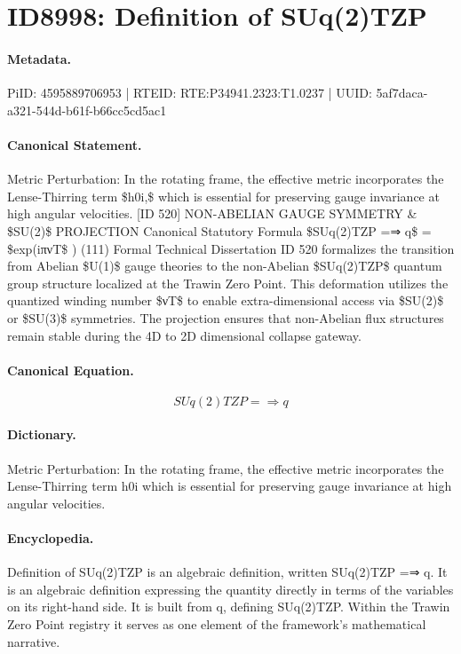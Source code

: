 \section*{ID8998: Definition of SUq(2)TZP}
\paragraph{Metadata.}
PiID: 4595889706953 | RTEID: RTE:P34941.2323:T1.0237 | UUID: 5af7daca-a321-544d-b61f-b66cc5cd5ac1

\paragraph{Canonical Statement.}
Metric Perturbation: In the rotating frame, the effective metric incorporates the Lense-Thirring term \$h0i,\$ which is essential for preserving gauge invariance at high angular velocities. [ID 520] NON-ABELIAN GAUGE SYMMETRY \& \$SU(2)\$ PROJECTION Canonical Statutory Formula \$SUq(2)TZP =⇒ q\$ = \$exp(iπνT\$ ) (111) Formal Technical Dissertation ID 520 formalizes the transition from Abelian \$U(1)\$ gauge theories to the non-Abelian \$SUq(2)TZP\$ quantum group structure localized at the Trawin Zero Point. This deformation utilizes the quantized winding number \$νT\$ to enable extra-dimensional access via \$SU(2)\$ or \$SU(3)\$ symmetries. The projection ensures that non-Abelian flux structures remain stable during the 4D to 2D dimensional collapse gateway.

\paragraph{Canonical Equation.}
\[
SUq(2)TZP =⇒ q
\]

\paragraph{Dictionary.}
Metric Perturbation: In the rotating frame, the effective metric incorporates the Lense-Thirring term h0i which is essential for preserving gauge invariance at high angular velocities.

\paragraph{Encyclopedia.}
Definition of SUq(2)TZP is an algebraic definition, written SUq(2)TZP =⇒ q. It is an algebraic definition expressing the quantity directly in terms of the variables on its right-hand side. It is built from q, defining SUq(2)TZP. Within the Trawin Zero Point registry it serves as one element of the framework's mathematical narrative.
